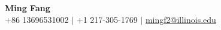 \documentclass[letterpaper,11pt]{article} %
\begin{document}

% 
\begin{comment}
In Europe it is common to include a picture of ones self in the CV. Select
which heading appropriate for the document you are creating.
\end{comment}


\begin{center}
    \textbf{\Huge Ming Fang} \\ \vspace{1pt} %
    \small 
    +86 13696531002 $|$
    +1 217-305-1769 $|$
    \href{mailto:mingf2@illinois.edu}{{mingf2@illinois.edu}}
\end{center}
\end{document}
